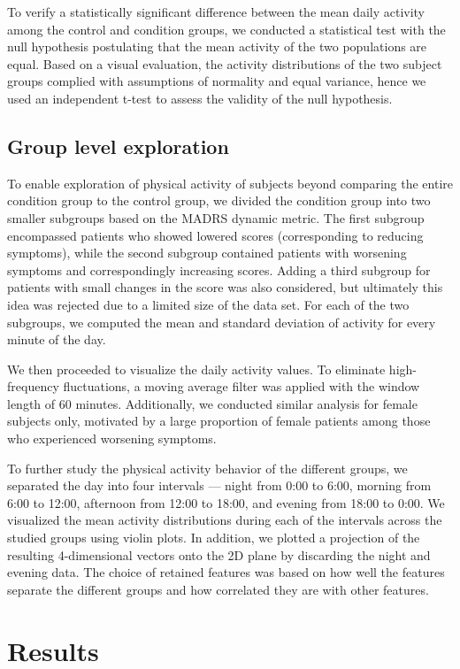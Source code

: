 \documentclass[12pt]{article}
\begin{document}
To verify a statistically significant difference between the mean daily activity among the control and condition groups, we conducted a statistical test with the null hypothesis postulating that the mean activity of the two populations are equal. Based on a visual evaluation, the activity distributions of the two subject groups complied with assumptions of normality and equal variance, hence we used an independent t-test \parencite{student1908probable} to assess the validity of the null hypothesis.

\subsection{Group level exploration}

To enable exploration of physical activity of subjects beyond comparing the entire condition group to the control group, we divided the condition group into two smaller subgroups based on the MADRS dynamic metric. The first subgroup encompassed patients who showed lowered scores (corresponding to reducing symptoms), while the second subgroup contained patients with worsening symptoms and correspondingly increasing scores. Adding a third subgroup for patients with small changes in the score was also considered, but ultimately this idea was rejected due to a limited size of the data set. For each of the two subgroups, we computed the mean and standard deviation of activity for every minute of the day.

We then proceeded to visualize the daily activity values. To eliminate high-frequency fluctuations, a moving average filter was applied with the window length of 60 minutes. Additionally, we conducted similar analysis for female subjects only, motivated by a large proportion of female patients among those who experienced worsening symptoms.

To further study the physical activity behavior of the different groups, we separated the day into four intervals — night from 0:00 to 6:00, morning from 6:00 to 12:00, afternoon from 12:00 to 18:00, and evening from 18:00 to 0:00. We visualized the mean activity distributions during each of the intervals across the studied groups using violin plots. In addition, we plotted a projection of the resulting 4-dimensional vectors onto the 2D plane by discarding the night and evening data. The choice of retained features was based on how well the features separate the different groups and how correlated they are with other features.

\section{Results}
\end{document}
